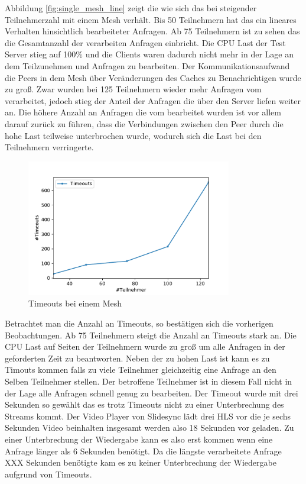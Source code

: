 Abbildung \ref{fig:single_mesh_line} zeigt die wie sich das \pTp \cdn bei steigender Teilnehmerzahl mit einem Mesh verhält. Bis 50 Teilnehmern hat das \cdn ein lineares Verhalten hinsichtlich bearbeiteter Anfragen. Ab 75 Teilnehmern ist zu sehen das die Gesamtanzahl der verarbeiten Anfragen einbricht. Die CPU Last der Test Server stieg auf 100\% und die Clients waren dadurch nicht mehr in der Lage an dem \cdn Teilzunehmen und Anfragen zu bearbeiten. Der Kommunikationsaufwand die Peers in dem Mesh über Veränderungen des Caches zu Benachrichtigen wurde zu groß. Zwar wurden bei 125 Teilnehmern wieder mehr Anfragen vom \cdn verarbeitet, jedoch stieg der Anteil der Anfragen die über den Server liefen weiter an. Die höhere Anzahl an Anfragen die vom \cdn bearbeitet wurden ist vor allem darauf zurück zu führen, dass die Verbindungen zwischen den Peer durch die hohe Last teilweise unterbrochen wurde, wodurch sich die Last bei den Teilnehmern verringerte.   

\begin{figure}[!h]
	\centering
	\includegraphics[width=0.8\textwidth]{figures/timeouts_single}
	\caption[A Figure Short-Title]{Timeouts bei einem Mesh}
	\label{fig:timeouts_single}
\end{figure}

Betrachtet man die Anzahl an Timeouts, so bestätigen sich die vorherigen Beobachtungen. Ab 75 Teilnehmern steigt die Anzahl an Timeouts stark an. Die CPU Last auf Seiten der Teilnehmern wurde zu groß um alle Anfragen in der geforderten Zeit zu beantworten. Neben der zu hohen Last ist kann es zu Timouts kommen falls zu viele Teilnehmer gleichzeitig eine Anfrage an den Selben Teilnehmer stellen. Der betroffene Teilnehmer ist in diesem Fall nicht in der Lage alle Anfragen schnell genug zu bearbeiten. Der Timeout wurde mit drei Sekunden so gewählt das es trotz Timeouts nicht zu einer Unterbrechung des Streams kommt. Der Video Player von Slidesync lädt drei HLS vor die je sechs Sekunden Video beinhalten insgesamt werden also 18 Sekunden vor geladen. Zu einer Unterbrechung der Wiedergabe kann es also erst kommen wenn eine Anfrage länger als 6 Sekunden benötigt. Da die längste verarbeitete Anfrage XXX Sekunden benötigte kam es zu keiner Unterbrechung der Wiedergabe aufgrund von Timeouts.

